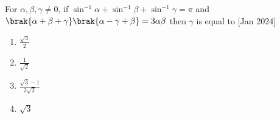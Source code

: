 \item For $\alpha, \beta, \gamma \ne 0$, if $\sin^{-1}\alpha + \sin^{-1}\beta + \sin^{-1}\gamma = \pi$
    and $\brak{\alpha+\beta+\gamma}\brak{\alpha-\gamma+\beta} = 3\alpha\beta$ then $\gamma$ is
    equal to
    \hfill{[Jan 2024]}

    \begin{multicols}{4}
        \begin{enumerate}

            \item $\frac{\sqrt{3}}{2}$
            \item $\frac{1}{\sqrt{2}}$
            \item $\frac{\sqrt{3} - 1}{2\sqrt{2}}$
            \item $\sqrt{3}$
        \end{enumerate}
    \end{multicols}
